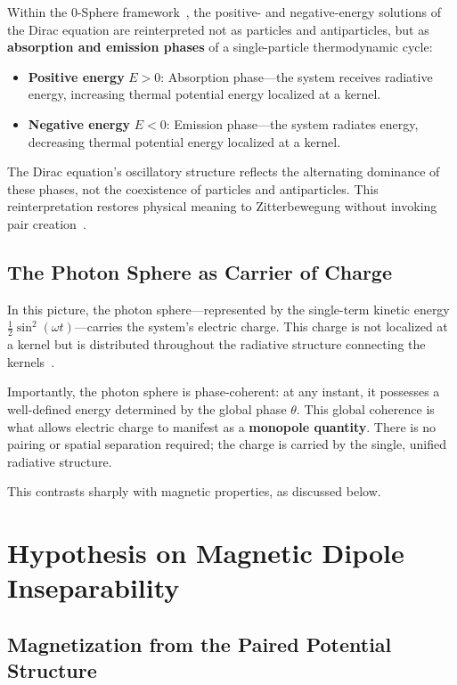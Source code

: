 \documentclass[12pt,letterpaper]{article}
\begin{document}
Within the 0-Sphere framework~\cite{hanamura17760132}, the positive- and negative-energy solutions of the Dirac equation are reinterpreted not as particles and antiparticles, but as \textbf{absorption and emission phases} of a single-particle thermodynamic cycle:
\begin{itemize}
\item \textbf{Positive energy} $E > 0$: Absorption phase—the system receives radiative energy, increasing thermal potential energy localized at a kernel.
\item \textbf{Negative energy} $E < 0$: Emission phase—the system radiates energy, decreasing thermal potential energy localized at a kernel.
\end{itemize}

The Dirac equation's oscillatory structure reflects the alternating dominance of these phases, not the coexistence of particles and antiparticles. This reinterpretation restores physical meaning to Zitterbewegung without invoking pair creation~\cite{hanamura18356895}.

\subsection{The Photon Sphere as Carrier of Charge}

In this picture, the photon sphere—represented by the single-term kinetic energy $\frac{1}{2}\sin^2(\omega t)$—carries the system's electric charge. This charge is not localized at a kernel but is distributed throughout the radiative structure connecting the kernels~\cite{hanamura18603340}.

Importantly, the photon sphere is phase-coherent: at any instant, it possesses a well-defined energy determined by the global phase $\theta$. This global coherence is what allows electric charge to manifest as a \textbf{monopole quantity}. There is no pairing or spatial separation required; the charge is carried by the single, unified radiative structure.

This contrasts sharply with magnetic properties, as discussed below.


\section{Hypothesis on Magnetic Dipole Inseparability}

\subsection{Magnetization from the Paired Potential Structure}
\end{document}
